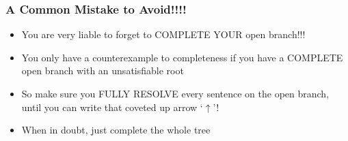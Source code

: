 \begin{frame}










\end{itemize}
\end{frame}

\begin{frame}
\frametitle{A Common Mistake to Avoid!!!!}

\begin{itemize}[<+->]

\item You are very liable to forget to COMPLETE YOUR open branch!!!

\item You only have a counterexample to completeness if you have a COMPLETE open branch with an unsatisfiable root

\item So make sure you FULLY RESOLVE every sentence on the open branch, until you can write that coveted up arrow `$\uparrow$'! 

\item When in doubt, just complete the whole tree 


\end{itemize}
\end{frame}


